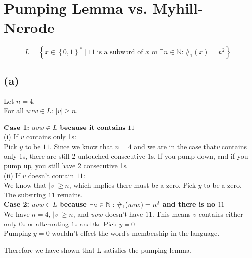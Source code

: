 



\setcounter{section}{2}

\section{Pumping Lemma vs. Myhill-Nerode}

$$L = \left\{ x \in \left\{0,1\right\}^{\ast} \mid 11\text{ is a subword of }x\text{ or } \exists n \in \mathbb{N}:\#_{1}(x)=n^{2}\right\}$$

\subsection{(a)}
Let \( n = 4 \). \\
For all \( uvw \in L \): \( |v| \geq n \).

\textbf{Case 1: $uvw \in L$ because it contains $11$}\\
(i) If \( v \) contains only 1s:\\ Pick \( y \) to be \( 11 \). Since we know that \( n = 4 \) and we are in the case that\( v \) contains only 1s, there are still 2 untouched consecutive 1s. If you pump down, and if you pump up, you still have 2 consecutive 1s.\\
(ii) If \( v \) doesn’t contain \( 11 \):\\
We know that \( |v| \geq n \), which implies there must be a zero. Pick \( y \) to be a zero. The substring $11$ remains.\\

\textbf{Case 2: $uvw \in L$ because $\exists n \in \mathbb{N}: \#_{1}(uvw)=n^2$ and there is no $11$}\\
We have \( n = 4 \), \( |v| \geq n \), and \( uvw \) doesn’t have \( 11 \). This means \( v \) contains either only $0$s or alternating $1$s and $0$s. Pick \( y = 0 \).\\
Pumping \( y = 0 \) wouldn’t effect the word’s membership in the language. 

Therefore we have shown that L satisfies the pumping lemma.
